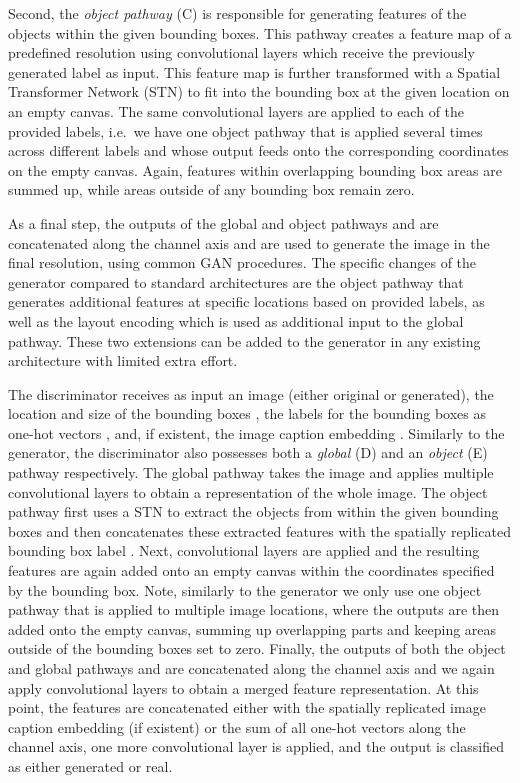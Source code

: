 \documentclass{article} \usepackage{iclr2019_conference,times}
\begin{document}
	Second, the \emph{object pathway} (C) is responsible for generating features of the objects  within the given bounding boxes.
	This pathway creates a feature map of a predefined resolution using convolutional layers which receive the previously generated label  as input.
	This feature map is further transformed with a Spatial Transformer Network (STN) \citep{jaderberg2015spatial} to fit into the bounding box at the given location on an empty canvas.
	The same convolutional layers are applied to each of the provided labels, i.e.\ we have one object pathway that is applied several times across different labels  and whose output feeds onto the corresponding coordinates on the empty canvas.
	Again, features within overlapping bounding box areas are summed up, while areas outside of any bounding box remain zero.
	
	As a final step, the outputs of the global and object pathways  and  are concatenated along the channel axis and are used to generate the image in the final resolution, using common GAN procedures.
	The specific changes of the generator compared to standard architectures are the object pathway that generates additional features at specific locations based on provided labels, as well as the layout encoding which is used as additional input to the global pathway.
	These two extensions can be added to the generator in any existing architecture with limited extra effort.
	
The discriminator receives as input an image (either original or generated), the location and size of the bounding boxes , the labels for the bounding boxes as one-hot vectors , and, if existent, the image caption embedding .
	Similarly to the generator, the discriminator also possesses both a \emph{global} (D) and an \emph{object} (E) pathway respectively.
	The global pathway takes the image and applies multiple convolutional layers to obtain a representation  of the whole image. 
	The object pathway first uses a STN to extract the objects from within the given bounding boxes and then concatenates these extracted features with the spatially replicated bounding box label .
	Next, convolutional layers are applied and the resulting features  are again added onto an empty canvas within the coordinates specified by the bounding box.
	Note, similarly to the generator we only use one object pathway that is applied to multiple image locations, where the outputs are then added onto the empty canvas, summing up overlapping parts and keeping areas outside of the bounding boxes set to zero.
	Finally, the outputs of both the object and global pathways  and  are concatenated along the channel axis and we again apply convolutional layers to obtain a merged feature representation.
	At this point, the features are concatenated either with the spatially replicated image caption embedding  (if existent) or the sum of all one-hot vectors  along the channel axis, one more convolutional layer is applied, and the output is classified as either generated or real.
	
\end{document}
